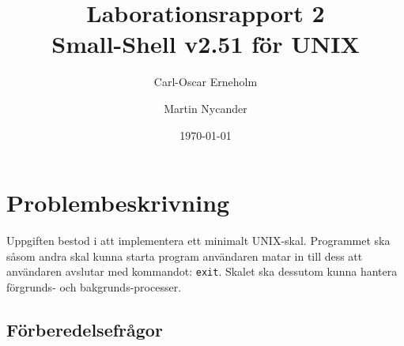 \documentclass[a4paper,10pt,titlepage]{article}
\title{Laborationsrapport 2 \\ Small-Shell v2.51 för UNIX}
\author{Carl-Oscar Erneholm \and Martin Nycander}
\date{\today}
\begin{document}


\maketitle

\tableofcontents
\thispagestyle{empty}
\newpage
\setcounter{page}{1}
\section{Problembeskrivning}

Uppgiften bestod i att implementera ett minimalt UNIX-skal. Programmet ska såsom
andra skal kunna starta program användaren matar in till dess att användaren
avslutar med kommandot: \verb!exit!. Skalet ska dessutom kunna hantera
förgrunds- och bakgrunds-processer.

\subsection{Förberedelsefrågor}
\end{document}
